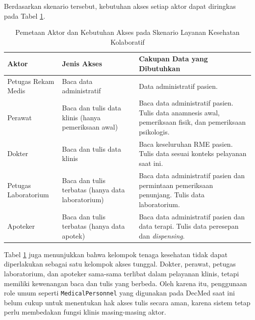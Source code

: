 Berdasarkan skenario tersebut, kebutuhan akses setiap aktor dapat diringkas pada Tabel \ref{tab:skenario-layanan-kolaboratif}.

\begin{table}[H]
	\centering
	\caption{Pemetaan Aktor dan Kebutuhan Akses pada Skenario Layanan Kesehatan Kolaboratif}
	\label{tab:skenario-layanan-kolaboratif}
	\small
	\begin{tabular}{|p{}|p{}|p{}|}
		\hline
		\textbf{Aktor}       & \textbf{Jenis Akses}                                & \textbf{Cakupan Data yang Dibutuhkan}                                                                     \\ \hline
		Petugas Rekam Medis  & Baca data administratif                             & Data administratif pasien.                                                                                \\ \hline
		Perawat              & Baca dan tulis data klinis (hanya pemeriksaan awal) & Baca data administratif pasien. Tulis data anamnesis awal, pemeriksaan fisik, dan pemeriksaan psikologis. \\ \hline
		Dokter               & Baca dan tulis data klinis                          & Baca keseluruhan RME pasien. Tulis data sesuai konteks pelayanan saat ini.                                \\ \hline
		Petugas Laboratorium & Baca dan tulis terbatas (hanya data laboratorium)   & Baca data administratif pasien dan permintaan pemeriksaan penunjang. Tulis data laboratorium.             \\ \hline
		Apoteker             & Baca dan tulis terbatas (hanya data apotek)         & Baca data administratif pasien dan data terapi. Tulis data peresepan dan \textit{dispensing}.             \\ \hline
	\end{tabular}
\end{table}

Tabel \ref{tab:skenario-layanan-kolaboratif} juga menunjukkan bahwa kelompok tenaga kesehatan tidak dapat diperlakukan sebagai satu kelompok akses tunggal. Dokter, perawat, petugas laboratorium, dan apoteker sama-sama terlibat dalam pelayanan klinis, tetapi memiliki kewenangan baca dan tulis yang berbeda. Oleh karena itu, penggunaan role umum seperti \texttt{MedicalPersonnel} yang digunakan pada DecMed saat ini belum cukup untuk menentukan hak akses tulis secara aman, karena sistem tetap perlu membedakan fungsi klinis masing-masing aktor.

